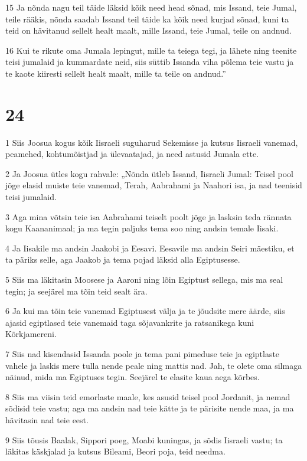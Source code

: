 \par 15 Ja nõnda nagu teil täide läksid kõik need head sõnad, mis Issand, teie Jumal, teile rääkis, nõnda saadab Issand teil täide ka kõik need kurjad sõnad, kuni ta teid on hävitanud sellelt healt maalt, mille Issand, teie Jumal, teile on andnud.
\par 16 Kui te rikute oma Jumala lepingut, mille ta teiega tegi, ja lähete ning teenite teisi jumalaid ja kummardate neid, siis süttib Issanda viha põlema teie vastu ja te kaote kiiresti sellelt healt maalt, mille ta teile on andnud.”

\chapter{24}

\par 1 Siis Joosua kogus kõik Iisraeli suguharud Sekemisse ja kutsus Iisraeli vanemad, peamehed, kohtumõistjad ja ülevaatajad, ja need astusid Jumala ette.
\par 2 Ja Joosua ütles kogu rahvale: „Nõnda ütleb Issand, Iisraeli Jumal: Teisel pool jõge elasid muiste teie vanemad, Terah, Aabrahami ja Naahori isa, ja nad teenisid teisi jumalaid.
\par 3 Aga mina võtsin teie isa Aabrahami teiselt poolt jõge ja lasksin teda rännata kogu Kaananimaal; ja ma tegin paljuks tema soo ning andsin temale Iisaki.
\par 4 Ja Iisakile ma andsin Jaakobi ja Eesavi. Eesavile ma andsin Seiri mäestiku, et ta päriks selle, aga Jaakob ja tema pojad läksid alla Egiptusesse.
\par 5 Siis ma läkitasin Moosese ja Aaroni ning lõin Egiptust sellega, mis ma seal tegin; ja seejärel ma tõin teid sealt ära.
\par 6 Ja kui ma tõin teie vanemad Egiptusest välja ja te jõudsite mere äärde, siis ajasid egiptlased teie vanemaid taga sõjavankrite ja ratsanikega kuni Kõrkjamereni.
\par 7 Siis nad kisendasid Issanda poole ja tema pani pimeduse teie ja egiptlaste vahele ja laskis mere tulla nende peale ning mattis nad. Jah, te olete oma silmaga näinud, mida ma Egiptuses tegin. Seejärel te elasite kaua aega kõrbes.
\par 8 Siis ma viisin teid emorlaste maale, kes asusid teisel pool Jordanit, ja nemad sõdisid teie vastu; aga ma andsin nad teie kätte ja te pärisite nende maa, ja ma hävitasin nad teie eest.
\par 9 Siis tõusis Baalak, Sippori poeg, Moabi kuningas, ja sõdis Iisraeli vastu; ta läkitas käskjalad ja kutsus Bileami, Beori poja, teid needma.
